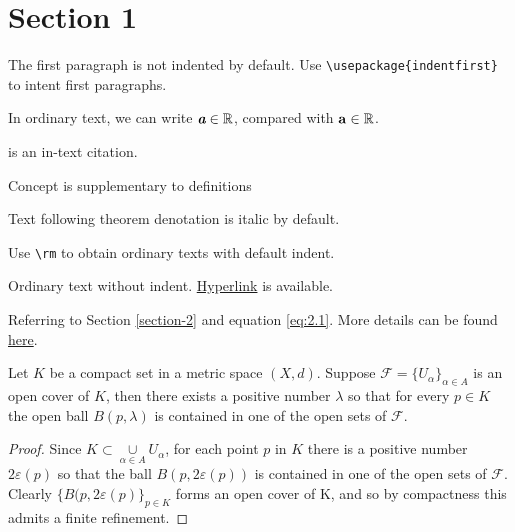 \section{Section 1} \label{section-1}

The first paragraph is not indented by default. Use \texttt{\textbackslash usepackage\{indentfirst\}} to intent first paragraphs.

In ordinary text, we can write $\textbf{\em a} \in \mathbb{R}$, compared with $\mathbf{a} \in \mathbb{R}$.

 \cite{einstein} is an in-text citation. 

\concept Concept is supplementary to definitions

Text following theorem denotation is italic by default.

\rm %

Use \texttt{\textbackslash rm} to obtain ordinary texts with default indent.

\noindent Ordinary text without indent. \href{https://www.overleaf.com/learn/latex/Hyperlinks}{Hyperlink} is available. 

Referring to Section \ref{section-2} and equation \ref{eq:2.1}. More details can be found \href{https://www.overleaf.com/learn/latex/Cross_referencing_sections%2C_equations_and_floats}{here}.

\thm Let $K$ be a compact set in a metric space $(X,d)$. Suppose $\mathcal{F}=\{U_\alpha\}_{\alpha \in A}$ is an open cover of $K$, then there exists a positive number $\lambda$ so that for every $p \in K$ the open ball $B(p,\lambda)$ is contained in one of the open sets of $\mathcal{F}$.

\begin{proof}

Since $K \subset \underset{\alpha \in A}\cup U_\alpha$, for each point $p$ in $K$ there is a positive number $2\varepsilon(p)$ so that the ball $B(p,2\varepsilon(p))$ is contained in one of the open sets of $\mathcal{F}$. Clearly $\{B(p,2\varepsilon(p)\}_{p \in K}$ forms an open cover of K, and so by compactness this admits a finite refinement.

\end{proof}

\rm %